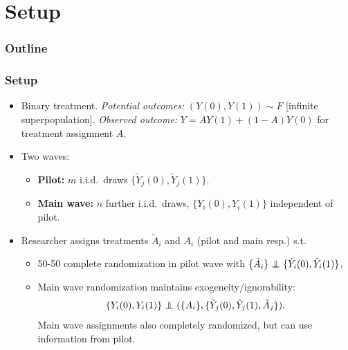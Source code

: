 \documentclass[aspectratio=169, 10pt]{beamer}
\theoremstyle{definition}
\theoremstyle{plain}
\newcommand{\indep}{\mathrel{\perp\mspace{-11mu}\perp}}
\begin{document}
\section{Setup}

\begin{frame}
  \frametitle{Outline}
  \tableofcontents[currentsection]
\end{frame}

\begin{frame}
\frametitle{Setup}

\begin{itemize}
  \item Binary treatment. \emph{Potential outcomes:}
    \((Y (0), Y (1)) \sim F\) [infinite superpopulation].
    \emph{Observed outcome:} \(Y = A Y (1) + (1 - A) Y (0)\) for treatment
    assignment \(A\).
    \vfill
  \item Two waves:
    \vfill
    \begin{itemize}
      \item \textbf{Pilot:} \(m\) i.i.d.\ draws \(\{\tilde{Y}_{j} (0),
        \tilde{Y}_{j} (1)\}\).
        \vfill
      \item \textbf{Main wave:} \(n\) further i.i.d.\ draws, \(\{Y_{i} (0),
        Y_{i} (1)\}\) independent of pilot.
    \end{itemize}
    \vfill
  \item Researcher assigns treatments \(\tilde{A}_{i}\) and \(A_{i}\) (pilot and
    main resp.) s.t.
    \vfill
    \begin{itemize}
      \item 50-50 complete randomization in pilot wave with \(\{\tilde{A}_{i}\}
        \indep \{\tilde{Y}_{i} (0), \tilde{Y}_{i} (1)\}\),
        \vfill
      \item Main wave randomization maintains exogeneity/ignorability:
        \begin{equation*}
          \{Y_{i} (0), Y_{i} (1)\} \indep (\{A_{i}\}, \{\tilde{Y}_{j} (0),
          \tilde{Y}_{j} (1), \tilde{A}_{j}\}).
        \end{equation*}
        Main wave assignments also completely randomized, but can use
        information from pilot.
    \end{itemize}
\end{itemize}
\end{frame}
\end{document}
